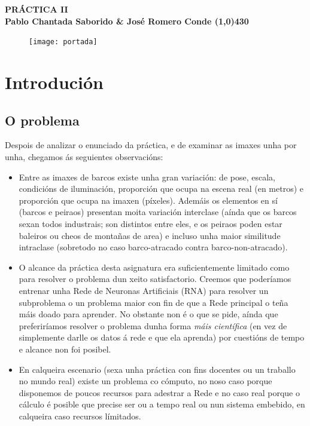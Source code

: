 \documentclass{article}
\begin{document}
	\begin{center}
		\LARGE\bfseries PRÁCTICA II\\
		\small Pablo Chantada Saborido \& José Romero Conde
		\line(1,0){430}
	\end{center}
	
\vspace*{380pt}
	
\begin{figure}[h]
	\centering
	\texttt{[image: portada]}
	\label{fig:portada}
\end{figure}
	
\thispagestyle{empty}
	
\newpage

\tableofcontents

\newpage
	
	
\section{Introdución}
\subsection{O problema}

Despois de analizar o enunciado da práctica, e de examinar as imaxes unha por unha, chegamos ás seguientes observacións:
\begin{itemize}
	\item Entre as imaxes de barcos existe unha gran variación: de pose, escala, condicións de iluminación, proporción que ocupa na escena real (en metros) e proporción que ocupa na imaxen (píxeles). Ademáis os elementos en sí (barcos e peiraos) presentan moita variación interclase (aínda que os barcos sexan todos industrais; son distintos entre eles, e os peiraos poden estar baleiros ou cheos de montañas de area) e incluso unha maior similitude intraclase (sobretodo no caso barco-atracado contra barco-non-atracado).
	\item O alcance da práctica desta asignatura era suficientemente limitado como para resolver o problema dun xeito satisfactorio. Creemos que poderíamos entrenar unha Rede de Neuronas Artificiais (RNA) para resolver un subproblema o un problema maior con fin de que a Rede principal o teña máis doado para aprender. No obstante non é o que se pide, aínda que preferiríamos resolver o problema dunha forma \emph{máis científica} (en vez de simplemente darlle os datos á rede e que ela aprenda) por cuestións de tempo e alcance non foi posibel.
	\item En calqueira escenario (sexa unha práctica con fins docentes ou un traballo no mundo real) existe un problema co cómputo, no noso caso porque disponemos de poucos recursos para adestrar a Rede e no caso real porque o cálculo é posible que precise ser ou a tempo real ou nun sistema embebido, en calqueira caso recursos límitados. 
\end{itemize}
\end{document}
